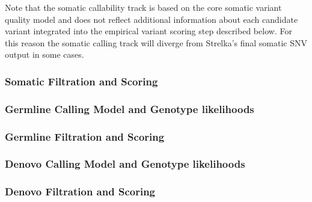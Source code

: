 \documentclass{article}
\begin{document}
Note that the somatic callability track is based on the core somatic variant quality model and does not reflect additional information about each candidate variant integrated into the empirical variant scoring step described below. For this reason the somatic calling track will diverge from Strelka's final somatic SNV output in some cases.



\subsubsection{Somatic Filtration and Scoring}

\subsubsection{Germline Calling Model and Genotype likelihoods}

\subsubsection{Germline Filtration and Scoring}

\subsubsection{Denovo Calling Model and Genotype likelihoods}

\subsubsection{Denovo Filtration and Scoring}




\end{document}
